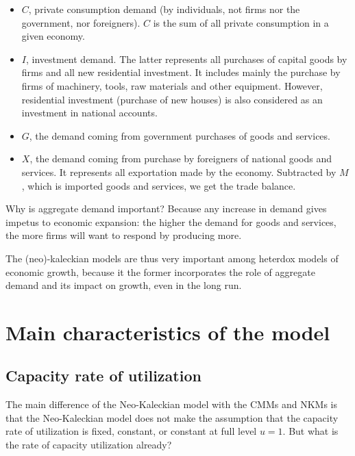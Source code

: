 \documentclass[
  letterpaper,
  DIV=11,
  numbers=noendperiod]{scrreprt}
\begin{document}
\begin{itemize}
\item
  \(C\), private consumption demand (by individuals, not firms nor the
  government, nor foreigners). \(C\) is the sum of all private
  consumption in a given economy.
\item
  \(I\), investment demand. The latter represents all purchases of
  capital goods by firms and all new residential investment. It includes
  mainly the purchase by firms of machinery, tools, raw materials and
  other equipment. However, residential investment (purchase of new
  houses) is also considered as an investment in national accounts.
\item
  \(G\), the demand coming from government purchases of goods and
  services.
\item
  \(X\), the demand coming from purchase by foreigners of national goods
  and services. It represents all exportation made by the economy.
  Subtracted by \(M\), which is imported goods and services, we get the
  trade balance.
\end{itemize}

Why is aggregate demand important? Because any increase in demand gives
impetus to economic expansion: the higher the demand for goods and
services, the more firms will want to respond by producing more.

The (neo)-kaleckian models are thus very important among heterdox models
of economic growth, because it the former incorporates the role of
aggregate demand and its impact on growth, even in the long run.

\hypertarget{main-characteristics-of-the-model}{%
\section{Main characteristics of the
model}\label{main-characteristics-of-the-model}}

\hypertarget{capacity-rate-of-utilization}{%
\subsection{Capacity rate of
utilization}\label{capacity-rate-of-utilization}}

The main difference of the Neo-Kaleckian model with the CMMs and NKMs is
that the Neo-Kaleckian model does not make the assumption that the
capacity rate of utilization is fixed, constant, or constant at full
level \(u = 1\). But what is the rate of capacity utilization already?
\end{document}
